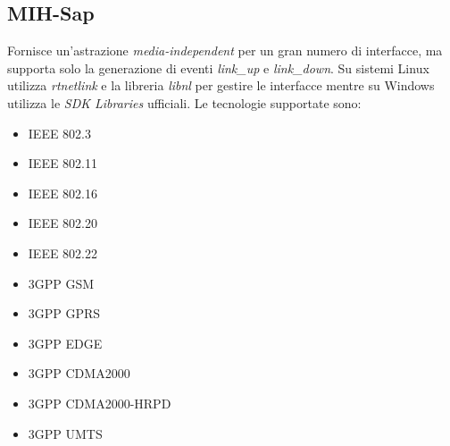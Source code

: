 \subsection{MIH-Sap}
Fornisce un'astrazione {\em media-independent} per un gran numero di interfacce, ma supporta solo la generazione di eventi {\em link\_up} e {\em link\_down}. Su sistemi Linux utilizza {\em rtnetlink} e la libreria {\em libnl}\cite{libnl} per gestire le interfacce mentre su Windows utilizza le {\em SDK Libraries} ufficiali.
Le tecnologie supportate sono:
\begin{itemize}
\item IEEE 802.3
\item IEEE 802.11
\item IEEE 802.16
\item IEEE 802.20
\item IEEE 802.22
\item 3GPP GSM
\item 3GPP GPRS
\item 3GPP EDGE
\item 3GPP CDMA2000
\item 3GPP CDMA2000-HRPD
\item 3GPP UMTS
\end{itemize}

